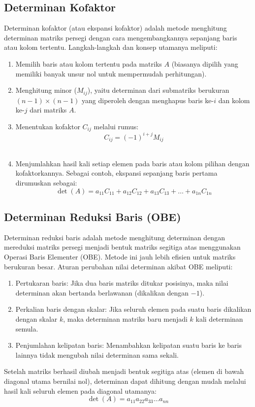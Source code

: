 \documentclass[12pt,a4paper]{report}
\begin{document}
\subsection{Determinan Kofaktor}
Determinan kofaktor (atau ekspansi kofaktor) adalah metode menghitung determinan matriks persegi dengan cara mengembangkannya sepanjang baris atau kolom tertentu. Langkah-langkah dan konsep utamanya meliputi:
\begin{enumerate}
    \item Memilih baris atau kolom tertentu pada matriks $A$ (biasanya dipilih yang memiliki banyak unsur nol untuk mempermudah perhitungan).
    \item Menghitung minor ($M_{ij}$), yaitu determinan dari submatriks berukuran $(n-1) \times (n-1)$ yang diperoleh dengan menghapus baris ke-$i$ dan kolom ke-$j$ dari matriks $A$.
    \item Menentukan kofaktor $C_{ij}$ melalui rumus:
    \[
    C_{ij} = (-1)^{i+j} M_{ij}
    \]
    \item Menjumlahkan hasil kali setiap elemen pada baris atau kolom pilihan dengan kofaktorkannya. Sebagai contoh, ekspansi sepanjang baris pertama dirumuskan sebagai:
    \[
    \det(A) = a_{11}C_{11} + a_{12}C_{12} + a_{13}C_{13} + \dots + a_{1n}C_{1n}
    \]
\end{enumerate}

\subsection{Determinan Reduksi Baris (OBE)}
Determinan reduksi baris adalah metode menghitung determinan dengan mereduksi matriks persegi menjadi bentuk matriks segitiga atas menggunakan Operasi Baris Elementer (OBE). Metode ini jauh lebih efisien untuk matriks berukuran besar. Aturan perubahan nilai determinan akibat OBE meliputi:
\begin{enumerate}
    \item Pertukaran baris: Jika dua baris matriks ditukar posisinya, maka nilai determinan akan bertanda berlawanan (dikalikan dengan $-1$).
    \item Perkalian baris dengan skalar: Jika seluruh elemen pada suatu baris dikalikan dengan skalar $k$, maka determinan matriks baru menjadi $k$ kali determinan semula.
    \item Penjumlahan kelipatan baris: Menambahkan kelipatan suatu baris ke baris lainnya tidak mengubah nilai determinan sama sekali.
\end{enumerate}
Setelah matriks berhasil diubah menjadi bentuk segitiga atas (elemen di bawah diagonal utama bernilai nol), determinan dapat dihitung dengan mudah melalui hasil kali seluruh elemen pada diagonal utamanya:
\[
\det(A) = a_{11} a_{22} a_{33} \dots a_{nn}
\]
\end{document}
